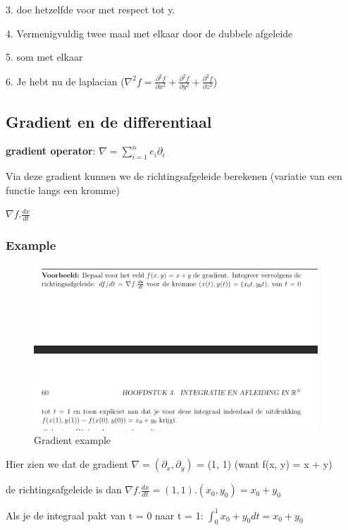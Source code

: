 \documentclass[a4paper]{report}
\begin{document}
3. doe hetzelfde voor met respect tot y.

4. Vermenigvuldig twee maal met elkaar door de dubbele afgeleide

5. som met elkaar

6. Je hebt nu de laplacian ($\nabla^2 f = \frac{\partial^2 f}{\partial x^2} + \frac{\partial^2 f}{\partial y^2} + \frac{\partial^2 f}{\partial z^2}$)

\subsection{Gradient en de differentiaal}

\textbf{gradient operator}: $\nabla = \sum_{i=1}^{n} e_i \partial_i$

Via deze gradient kunnen we de richtingsafgeleide berekenen (variatie van een functie langs een kromme)

$\nabla f . \frac{dx}{dt}$

\subsubsection{Example}

\begin{figure}[H]
	\begin{center}
		\includegraphics[width=0.95\textwidth]{./images/gradient.png}
	\end{center}
	\caption{Gradient example}
	\label{}
\end{figure}

Hier zien we dat de gradient $\nabla = (\partial_x, \partial_y)$ = (1, 1) (want f(x, y) = x + y)

de richtingsafgeleide is dan $\nabla f . \frac{dx}{dt} = (1, 1) . (x_0, y_0) = x_0 + y_0$

Als je de integraal pakt van t = 0 naar t = 1: $\int_0^1 x_0 + y_0 dt = x_0 + y_0$
\end{document}
